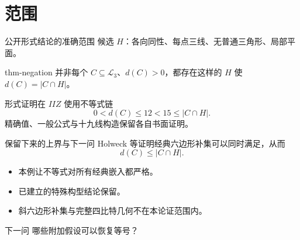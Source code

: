 \documentclass{beamer}
\begin{document}
\section{范围}
\begin{frame}{公开形式结论的准确范围}
候选 $H$：各向同性、每点三线、无普通三角形、局部平面。
\begin{bookresult}{thm-negation}
并非每个 $C\subseteq\mathcal L_3$、$d(C)>0$，都存在这样的 $H$ 使 $d(C)=|C\cap H|$。
\end{bookresult}
形式证明在 $IIZ$ 使用不等式链
\[0<d(C)\le12<15\le|C\cap H|.\]
精确值、一般公式与十九线构造保留各自书面证明。
\end{frame}
\begin{frame}{保留下来的上界与下一问}
Holweck 等证明经典六边形补集可以同时满足，从而
\[d(C)\le|C\cap H|.\]
\begin{itemize}
\item 本例让不等式对所有经典嵌入都严格。
\item 已建立的特殊构型结论保留。
\item 斜六边形补集与完整四比特几何不在本论证范围内。
\end{itemize}
\begin{block}{下一问}
哪些附加假设可以恢复等号？
\end{block}
\end{frame}
\appendix
\end{document}
